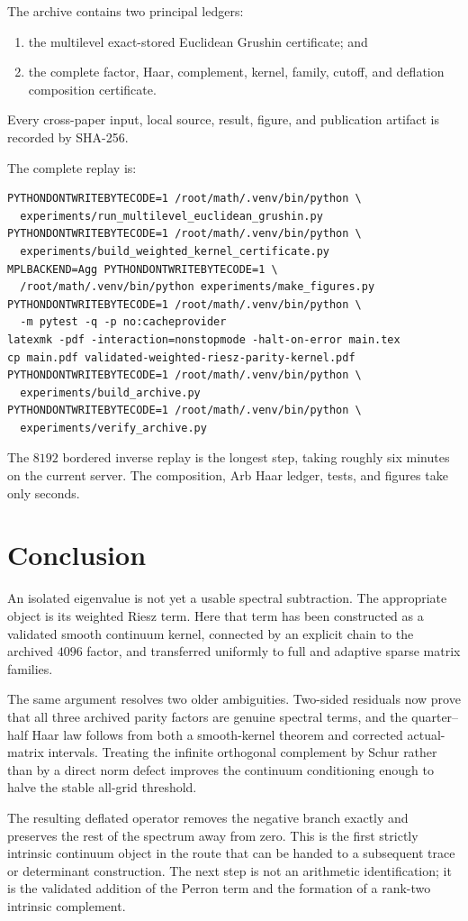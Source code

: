 \documentclass[11pt]{article}
\theoremstyle{definition}
\theoremstyle{remark}
\begin{document}
The archive contains two principal ledgers:
\begin{enumerate}[leftmargin=2em]
 \item the multilevel exact-stored Euclidean Grushin certificate; and
 \item the complete factor, Haar, complement, kernel, family, cutoff, and
       deflation composition certificate.
\end{enumerate}
Every cross-paper input, local source, result, figure, and publication
artifact is recorded by SHA-256.

The complete replay is:
\begin{verbatim}
PYTHONDONTWRITEBYTECODE=1 /root/math/.venv/bin/python \
  experiments/run_multilevel_euclidean_grushin.py
PYTHONDONTWRITEBYTECODE=1 /root/math/.venv/bin/python \
  experiments/build_weighted_kernel_certificate.py
MPLBACKEND=Agg PYTHONDONTWRITEBYTECODE=1 \
  /root/math/.venv/bin/python experiments/make_figures.py
PYTHONDONTWRITEBYTECODE=1 /root/math/.venv/bin/python \
  -m pytest -q -p no:cacheprovider
latexmk -pdf -interaction=nonstopmode -halt-on-error main.tex
cp main.pdf validated-weighted-riesz-parity-kernel.pdf
PYTHONDONTWRITEBYTECODE=1 /root/math/.venv/bin/python \
  experiments/build_archive.py
PYTHONDONTWRITEBYTECODE=1 /root/math/.venv/bin/python \
  experiments/verify_archive.py
\end{verbatim}

The $8192$ bordered inverse replay is the longest step, taking roughly six
minutes on the current server.  The composition, Arb Haar ledger, tests, and
figures take only seconds.

\section{Conclusion}

An isolated eigenvalue is not yet a usable spectral subtraction.  The
appropriate object is its weighted Riesz term.  Here that term has been
constructed as a validated smooth continuum kernel, connected by an
explicit chain to the archived $4096$ factor, and transferred uniformly to
full and adaptive sparse matrix families.

The same argument resolves two older ambiguities.  Two-sided residuals now
prove that all three archived parity factors are genuine spectral terms,
and the quarter--half Haar law follows from both a smooth-kernel theorem and
corrected actual-matrix intervals.  Treating the infinite orthogonal
complement by Schur rather than by a direct norm defect improves the
continuum conditioning enough to halve the stable all-grid threshold.

The resulting deflated operator removes the negative branch exactly and
preserves the rest of the spectrum away from zero.  This is the first
strictly intrinsic continuum object in the route that can be handed to a
subsequent trace or determinant construction.  The next step is not an
arithmetic identification; it is the validated addition of the Perron term
and the formation of a rank-two intrinsic complement.



\end{document}
